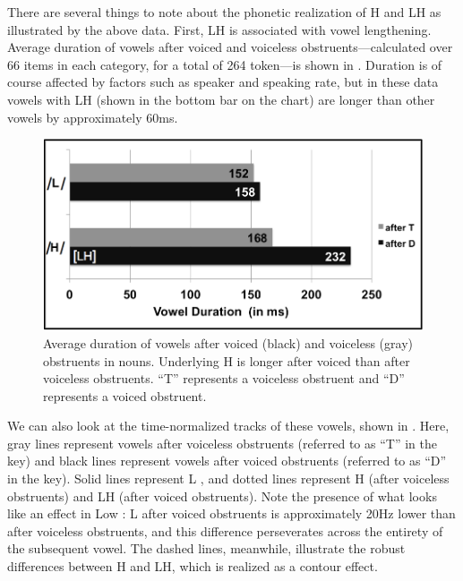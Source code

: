 \documentclass[output=paper,newtxmath,modfonts,nonflat]{langsci/langscibook}
\begin{document}
There are several things to note about the phonetic realization of H and LH as illustrated by the above data. First, LH  is associated with vowel lengthening. Average duration of vowels after voiced and voiceless obstruents—calculated over 66 items in each category, for a total of 264 token—is shown in . Duration is of course affected by factors such as speaker and speaking rate, but in these data vowels with LH  (shown in the bottom bar on the chart) are longer than other vowels by approximately 60ms.


\begin{figure} 
\includegraphics[width=\textwidth]{figures/Lotven-img3.png}
\caption{\label{fig:lotven:3} Average duration of vowels after voiced (black) and voiceless (gray) obstruents in nouns. Underlying H is longer after voiced than after voiceless obstruents. “T” represents a voiceless obstruent and “D” represents a voiced obstruent.}
\end{figure}


We can also look at the time-normalized  tracks of these vowels, shown in . Here, gray lines represent vowels after voiceless obstruents (referred to as “T” in the key) and black lines represent vowels after voiced obstruents (referred to as “D” in the key). Solid lines represent L , and dotted lines represent H (after voiceless obstruents) and LH (after voiced obstruents). Note the presence of what looks like an   effect in Low : L after voiced obstruents is approximately 20Hz lower than after voiceless obstruents, and this difference perseverates across the entirety of the subsequent vowel. The dashed lines, meanwhile, illustrate the robust  differences between H and LH, which is realized as a contour effect. 
\end{document}
